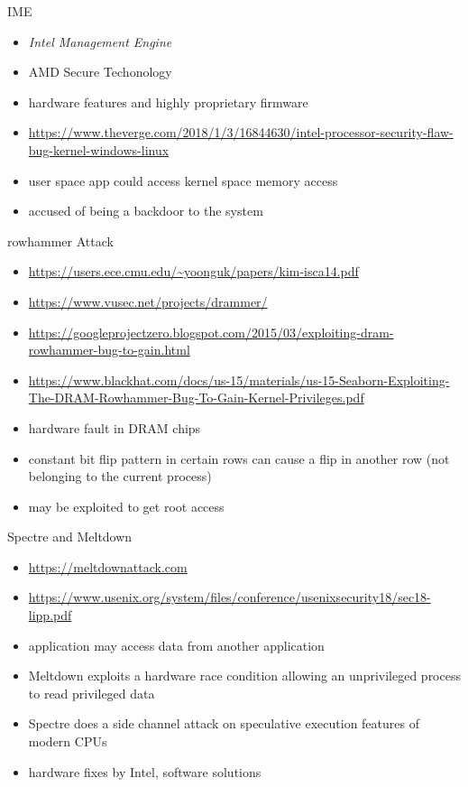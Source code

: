 \documentclass{curs}
\begin{document}
\begin{frame}{IME}
  \begin{itemize}
    \pause \item \textit{Intel Management Engine}
    \pause \item AMD Secure Techonology
    \pause \item hardware features and highly proprietary firmware
    \pause \item \url{https://www.theverge.com/2018/1/3/16844630/intel-processor-security-flaw-bug-kernel-windows-linux}
    \pause \item user space app could access kernel space memory access
    \pause \item accused of being a backdoor to the system
  \end{itemize}
\end{frame}

\begin{frame}{rowhammer Attack}
  \begin{itemize}
    \pause \item \url{https://users.ece.cmu.edu/~yoonguk/papers/kim-isca14.pdf}
    \pause \item \url{https://www.vusec.net/projects/drammer/}
    \pause \item \url{https://googleprojectzero.blogspot.com/2015/03/exploiting-dram-rowhammer-bug-to-gain.html}
    \pause \item \url{https://www.blackhat.com/docs/us-15/materials/us-15-Seaborn-Exploiting-The-DRAM-Rowhammer-Bug-To-Gain-Kernel-Privileges.pdf}
    \pause \item hardware fault in DRAM chips
    \pause \item constant bit flip pattern in certain rows can cause a flip in another row (not belonging to the current process)
    \pause \item may be exploited to get root access
  \end{itemize}
\end{frame}

\begin{frame}{Spectre and Meltdown}
  \begin{itemize}
    \pause \item \url{https://meltdownattack.com}
    \pause \item \url{https://www.usenix.org/system/files/conference/usenixsecurity18/sec18-lipp.pdf}
    \pause \item application may access data from another application
    \pause \item Meltdown exploits a hardware race condition allowing an unprivileged process to read privileged data
    \pause \item Spectre does a side channel attack on speculative execution features of modern CPUs
    \pause \item hardware fixes by Intel, software solutions
  \end{itemize}
\end{frame}
\end{document}
